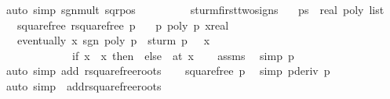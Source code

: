 \begin{isabellebody}
\ {\isacharparenleft}auto\ simp{\isacharcolon}\ sgn{\isacharunderscore}mult\ sqr{\isacharunderscore}pos{\isacharparenright}\ \isanewline
\ \ \ \ \isamarkupfalse%
\isanewline
\ \ \isamarkupfalse%
\isanewline
{}\isamarkupfalse%
%
\endisatagproof
{\isafoldproof}%
%
\isadelimproof
\isanewline
%
\endisadelimproof
\isanewline
{}\isamarkupfalse%
\ sturm{\isacharunderscore}firsttwo{\isacharunderscore}signs{\isacharcolon}\isanewline
\ \ \ ps\ {\isacharcolon}{\isacharcolon}\ {\isachardoublequoteopen}real\ poly\ list{\isachardoublequoteclose}\isanewline
\ \ \ squarefree{\isacharcolon}\ {\isachardoublequoteopen}rsquarefree\ p{\isachardoublequoteclose}\isanewline
\ \ \ p{\isacharunderscore}{}{\isacharcolon}\ {\isachardoublequoteopen}poly\ p\ {\isacharparenleft}xreal{\isacharparenright}\ {\isacharequal}\ {}{\isachardoublequoteclose}\isanewline
\ \ \ {\isachardoublequoteopen}eventually\ {\isacharparenleft}{\isasymlambda}x{\isachardot}\ sgn\ {\isacharparenleft}poly\ {\isacharparenleft}p\ {\isacharasterisk}\ sturm\ p\ {\isacharbang}\ {}{\isacharparenright}\ x{\isacharparenright}\ {\isacharequal}\isanewline
\ \ \ \ \ \ \ \ \ \ \ \ \ {\isacharparenleft}if\ x\ {\isachargreater}\ x\ then\ {}\ else\ {\isacharminus}{}{\isacharparenright}{\isacharparenright}\ {\isacharparenleft}at\ x\isanewline
%
\isadelimproof
%
\endisadelimproof
%
\isatagproof
{}\isamarkupfalse%
{\isacharminus}\isanewline
\ \ \isamarkupfalse%
\ assms\ \isamarkupfalse%
\ {\isacharbrackleft}simp{\isacharbrackright}{\isacharcolon}\ {\isachardoublequoteopen}p\ {\isasymnoteq}\ {}{\isachardoublequoteclose}\ \isamarkupfalse%
\ {\isacharparenleft}auto\ simp\ add{\isacharcolon}\ rsquarefree{\isacharunderscore}roots{\isacharparenright}\isanewline
\ \ \isamarkupfalse%
\ squarefree\ p{\isacharunderscore}{}\ \isamarkupfalse%
\ {\isacharbrackleft}simp{\isacharbrackright}{\isacharcolon}\ {\isachardoublequoteopen}pderiv\ p\ {\isasymnoteq}\ {}{\isachardoublequoteclose}\isanewline
\ \ \ \ \ \ \isamarkupfalse%
\ {\isacharparenleft}auto\ simp\ \ add{\isacharcolon}rsquarefree{\isacharunderscore}roots{\isacharparenright}\isanewline
\ \ \isamarkupfalse%

\end{isabellebody}
